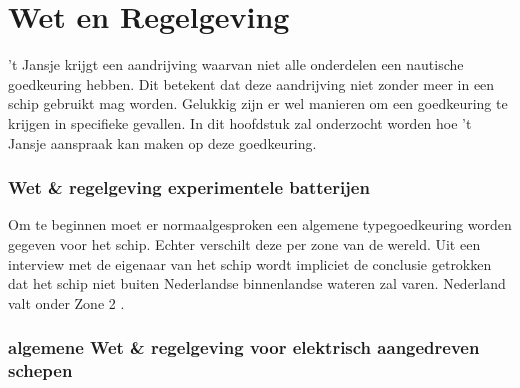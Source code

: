\chapter{Wet en Regelgeving}

't Jansje krijgt een aandrijving waarvan niet alle onderdelen een nautische goedkeuring hebben. Dit betekent dat deze aandrijving niet zonder meer in een schip gebruikt mag worden. Gelukkig zijn er wel manieren om een goedkeuring te krijgen in specifieke gevallen. In dit hoofdstuk zal onderzocht worden hoe 't Jansje aanspraak kan maken op deze goedkeuring.

\subsection{Wet \& regelgeving experimentele batterijen}
Om te beginnen moet er normaalgesproken een algemene typegoedkeuring worden gegeven voor het schip. Echter verschilt deze per zone van de wereld. Uit een interview met de eigenaar van het schip wordt impliciet de conclusie getrokken dat het schip niet buiten Nederlandse binnenlandse wateren zal varen. Nederland valt onder Zone 2 \cite{ministerie2026inlandrequirements}. 


\subsection{algemene Wet \& regelgeving voor elektrisch aangedreven schepen}

